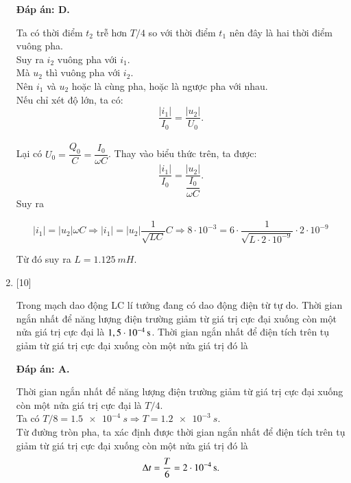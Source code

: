 \begin{enumerate}[label=\bfseries Câu \arabic*:]
	\hideall
	{		\textbf{Đáp án: D.}
		
		Ta có thời điểm $t_2$ trễ hơn $T/4$ so với thời điểm $t_1$ nên đây là hai thời điểm vuông pha. \\
		Suy ra $i_2$ vuông pha với $i_1$. \\
		Mà $u_2$ thì vuông pha với $i_2$. \\
		Nên $i_1$ và $u_2$ hoặc là cùng pha, hoặc là ngược pha với nhau. \\
		Nếu chỉ xét độ lớn, ta có:
		$$
		\dfrac{|i_1|}{I_0} = \dfrac{|u_2|}{U_0}.
		$$ \\
		Lại có $U_0 = \dfrac{Q_0}{C} = \dfrac{I_0}{\omega C}$. Thay vào biểu thức trên, ta được:
		$$
		\dfrac{|i_1|}{I_0} = \dfrac{|u_2|}{\dfrac{I_0}{\omega C}}.
		$$
		Suy ra 
		
		$$|i_1| = |u_2|\omega C \Rightarrow |i_1| = |u_2|\dfrac{1}{\sqrt{LC}} C \Rightarrow 8\cdot10^{-3} = 6 \cdot \dfrac{1}{\sqrt{L \cdot 2\cdot10^{-9}}} \cdot 2\cdot10^{-9}$$
		
		Từ đó suy ra $L = \SI{1,125}{mH}.$
		
	}
	
	
	\item {} [10]
	
	{Trong mạch dao động LC lí tưởng đang có dao động điện từ tự do. Thời gian ngắn nhất để năng lượng điện trường giảm từ giá trị cực đại xuống còn một nửa giá trị cực đại là $\xsi{1,5\cdot10^{-4}}{s}$. Thời gian ngắn nhất để điện tích trên tụ giảm từ giá trị cực đại xuống còn một nửa giá trị đó là
	}
	
	\hideall
	{		\textbf{Đáp án: A.}
		
		Thời gian ngắn nhất để năng lượng điện trường giảm từ giá trị cực đại xuống còn một nửa giá trị cực đại là $T/4$. \\
		Ta có $T/8 = \SI{1,5 e-4}{s} \Rightarrow T = \SI{1,2 e-3}{s}.$ \\ 
		Từ đường tròn pha, ta xác định được thời gian ngắn nhất để điện tích trên tụ giảm từ giá trị cực đại xuống còn một nửa giá trị đó là
		$$
		\Delta t = \dfrac{T}{6} = \xsi{2\cdot10^{-4}}{s}.
		$$	 
	}
	

\end{enumerate}

